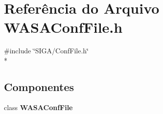 \section{Referência do Arquivo W\+A\+S\+A\+Conf\+File.\+h}
\label{_w_a_s_a_conf_file_8h}
{\ttfamily \#include \char`\"{}S\+I\+G\+A/\+Conf\+File.\+h\char`\"{}}\\*
\subsection*{Componentes}
\begin{DoxyCompactItemize}
\item 
class {\bf W\+A\+S\+A\+Conf\+File}
\end{DoxyCompactItemize}
